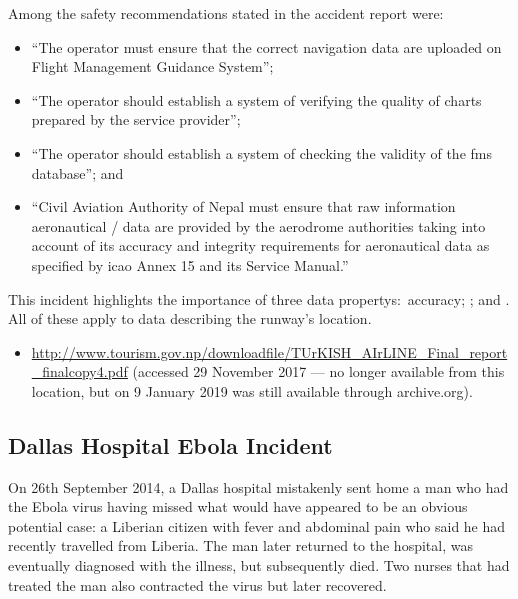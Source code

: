 Among the safety recommendations stated in the accident report were:
\begin{itemize}
  \item ``The operator must ensure that the correct navigation data are uploaded on Flight Management Guidance System''; 
  \item ``The operator should establish a system of verifying the quality of charts prepared by the service provider''; 
  \item ``The operator should establish a system of checking the validity of the \gls{fms} \gls{database}''; and
  \item ``Civil Aviation Authority of Nepal must ensure that raw \gls{information aeronautical} / data are provided by the aerodrome authorities taking into account of its accuracy and \gls{integrity} requirements for \gls{aeronautical data} as specified by \gls{icao} Annex 15 and its  Service Manual.''
\end{itemize}

This incident highlights the importance of three \cbstart\glspl{data property}:\cbend\ \gls{accuracy}; ; and . All of these apply to data describing the runway's location.

\begin{samepage}
\begin{itemize}
  \item \raggedright{\href{https://web.archive.org/web/20170709044727/http://www.tourism.gov.np/downloadfile/TUrKISH_AIrLINE_Final_report_finalcopy4.pdf}{http://www.tourism.gov.np/downloadfile/TUrKISH\_AIrLINE\_Final\_report\_finalcopy4.pdf} (accessed 29 November 2017 --- no longer available from this location, but on 9 January 2019 was still available through archive.org).}
\end{itemize}
\end{samepage}


\subsection{Dallas Hospital Ebola Incident} \label{bkm:incacc:dallasebola}
On 26th September 2014, a Dallas hospital mistakenly sent home a man who had the Ebola virus having missed what would have appeared to be an obvious potential case: a Liberian citizen with fever and abdominal pain who said he had recently travelled from Liberia. The man later returned to the hospital, was eventually diagnosed with the illness, but subsequently died. Two nurses that had treated the man also contracted the virus but later recovered.

